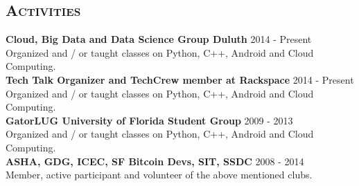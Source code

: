 \begin{resume}






\section{\textsc{Activities}}
\textbf{Cloud, Big Data and Data Science Group Duluth} \hfill 2014 - Present\\
Organized and / or taught classes on Python, C++, Android and Cloud Computing.\\
\textbf{Tech Talk Organizer and TechCrew member at Rackspace} \hfill 2014 - Present\\
Organized and / or taught classes on Python, C++, Android and Cloud Computing.\\
\textbf{GatorLUG University of Florida Student Group} \hfill 2009 - 2013\\
Organized and / or taught classes on Python, C++, Android and Cloud Computing.\\
\textbf{ASHA, GDG, ICEC, SF Bitcoin Devs, SIT, SSDC} \hfill 2008 - 2014\\
Member, active participant and volunteer of the above mentioned clubs.



\end{resume}

